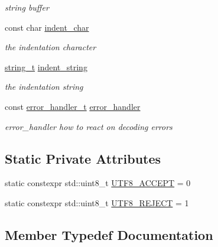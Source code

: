 \begin{DoxyCompactItemize}
\begin{DoxyCompactList}\small\item\em string buffer \end{DoxyCompactList}\item 
const char \hyperlink{classnlohmann_1_1detail_1_1serializer_a9a55e6b028d09676fe35aefa0c72ea5b}{indent\+\_\+char}
\begin{DoxyCompactList}\small\item\em the indentation character \end{DoxyCompactList}\item 
\hyperlink{classnlohmann_1_1detail_1_1serializer_ad08aa54fac1dd0a453320c54137d45ba}{string\+\_\+t} \hyperlink{classnlohmann_1_1detail_1_1serializer_ae9268a10d88a5526e32735a55a132fc6}{indent\+\_\+string}
\begin{DoxyCompactList}\small\item\em the indentation string \end{DoxyCompactList}\item 
const \hyperlink{namespacenlohmann_1_1detail_a5a76b60b26dc8c47256a996d18d967df}{error\+\_\+handler\+\_\+t} \hyperlink{classnlohmann_1_1detail_1_1serializer_a09d5a046fb0f7cb61977d6e5fbe8b3a1}{error\+\_\+handler}
\begin{DoxyCompactList}\small\item\em error\+\_\+handler how to react on decoding errors \end{DoxyCompactList}\end{DoxyCompactItemize}
\subsection*{Static Private Attributes}
\begin{DoxyCompactItemize}
\item 
static constexpr std\+::uint8\+\_\+t \hyperlink{classnlohmann_1_1detail_1_1serializer_a2311a8c756c4a119aa82cd55301d13bc}{U\+T\+F8\+\_\+\+A\+C\+C\+E\+PT} = 0
\item 
static constexpr std\+::uint8\+\_\+t \hyperlink{classnlohmann_1_1detail_1_1serializer_a833bd5805e4380549f4e21c304820d6d}{U\+T\+F8\+\_\+\+R\+E\+J\+E\+CT} = 1
\end{DoxyCompactItemize}


\subsection{Member Typedef Documentation}
\mbox{\label{classnlohmann_1_1detail_1_1serializer_a460c6794fbabbb2ae83380e987a6c030}} 
